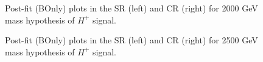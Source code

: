 \begin{figure}[H]
  \centering
  \caption{Post-fit (BOnly) plots in the SR (left) and CR (right) for 2000 GeV mass hypothesis of $H^{+}$ signal.}
  \label{fig:Postfit_Hp2000_Blind}
\end{figure}
\begin{figure}[H]
  \centering
  \caption{Post-fit (BOnly) plots in the SR (left) and CR (right) for 2500 GeV mass hypothesis of $H^{+}$ signal.}
  \label{fig:Postfit_Hp2500_Blind}
\end{figure}
